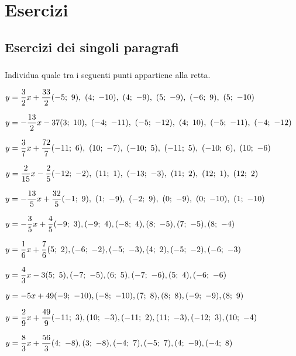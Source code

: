 
\section{Esercizi}

\subsection{Esercizi dei singoli paragrafi}

\subsubsection*{}

\begin{esercizio}\label{ese:}
 Individua quale tra i seguenti punti appartiene alla retta.
 \begin{enumeratea}
  \item  \(y = \dfrac{3}{2} x +\dfrac{33}{2} 
  \hfill (-5;~9),~(4;~-10),~(4;~-9),~(5;~-9),~(-6;~9),~(5;~-10)\)
  \item  \(y = -\dfrac{13}{2} x -37 
  \hfill (3;~10),~(-4;~-11),~(-5;~-12),~(4;~10),~(-5;~-11),~(-4;~-12)\)
  \item  \(y = \dfrac{3}{7} x +\dfrac{72}{7} 
  \hfill (-11;~6),~(10;~-7),~(-10;~5),~(-11;~5),~(-10;~6),~(10;~-6)\)
  \item  \(y = \dfrac{2}{15} x -\dfrac{2}{5} 
  \hfill (-12;~-2),~(11;~1),~(-13;~-3),~(11;~2),~(12;~1),~(12;~2)\)
  \item  \(y = -\dfrac{13}{5} x +\dfrac{32}{5} 
  \hfill (-1;~9),~(1;~-9),~(-2;~9),~(0;~-9),~(0;~-10),~(1;~-10)\)
  \item  \(y = -\dfrac{3}{5} x +\dfrac{4}{5} 
  \hfill (-9;~3), (-9;~4), (-8;~4), (8;~-5), (7;~-5), (8;~-4)\)
  \item  \(y = \dfrac{1}{6} x +\dfrac{7}{6} 
  \hfill (5;~2), (-6;~-2), (-5;~-3), (4;~2), (-5;~-2), (-6;~-3)\)
  \item  \(y = \dfrac{4}{3} x -3 
  \hfill (5;~5), (-7;~-5), (6;~5), (-7;~-6), (5;~4), (-6;~-6)\)
  \item  \(y = -5 x +49 
  \hfill (-9;~-10), (-8;~-10), (7;~8), (8;~8), (-9;~-9), (8;~9)\)
  \item  \(y = \dfrac{2}{9} x +\dfrac{49}{9} 
  \hfill (-11;~3), (10;~-3), (-11;~2), (11;~-3), (-12;~3), (10;~-4)\)
  \item  \(y = \dfrac{8}{3} x +\dfrac{56}{3} 
  \hfill (4;~-8), (3;~-8), (-4;~7), (-5;~7), (4;~-9), (-4;~8)\)

\end{enumeratea}
\end{esercizio}
